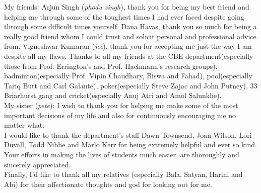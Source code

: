 \noindent My friends: Arjun Singh (\emph{phodu singh}), thank you for being my best friend and helping me through some of the toughest times I had ever faced despite going through some difficult times yourself. Dana Havas, thank you so much for being a really good friend whom I could trust and solicit personal and professional advice from. Vigneshwar Kumaran (\emph{jee}), thank you for accepting me just the way I am despite all my flaws. Thanks to all my friends at the CBE department(especially those from Prof. Errington's and Prof. Hachmann's research groups), badminton(especially Prof. Vipin Chaudhary, Biswa and Fahad), pool(especially Tariq Butt and Carl Galante), poker(especially Steve Zajac and John Putney), 33 Briarhurst gang and cricket(especially Anuj Atri and Amol Salunkhe).\\

\noindent My sister (\emph{pete}): I wish to thank you for helping me make some of the most important decisions of my life and also for continuously encouraging me no matter what.\\

\noindent I would like to thank the department's staff Dawn Townsend, Joan Wilson, Lori Duvall, Todd Nibbe and Marlo Kerr for being extremely helpful and ever so kind. Your efforts in making the lives of students much easier, are thoroughly and sincerely appreciated.\\

\noindent Finally, I'd like to thank all my relatives (especially Bala, Satyan, Harini and Abi) for their affectionate thoughts and god for looking out for me.
